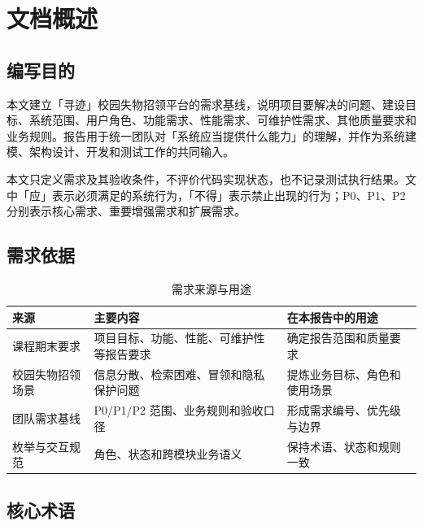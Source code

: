 \section{文档概述}

\subsection{编写目的}

本文建立「寻迹」校园失物招领平台的需求基线，说明项目要解决的问题、建设目标、系统范围、用户角色、功能需求、性能需求、可维护性需求、其他质量要求和业务规则。报告用于统一团队对「系统应当提供什么能力」的理解，并作为系统建模、架构设计、开发和测试工作的共同输入。

本文只定义需求及其验收条件，不评价代码实现状态，也不记录测试执行结果。文中「应」表示必须满足的系统行为，「不得」表示禁止出现的行为；P0、P1、P2 分别表示核心需求、重要增强需求和扩展需求。

\subsection{需求依据}

\begin{table}[H]
  \centering
  \caption{需求来源与用途}
  \begin{tabularx}{\textwidth}{L{3.0cm} Y Y}
    \toprule
    来源 & 主要内容 & 在本报告中的用途 \\
    \midrule
    课程期末要求 & 项目目标、功能、性能、可维护性等报告要求 & 确定报告范围和质量要求 \\
    校园失物招领场景 & 信息分散、检索困难、冒领和隐私保护问题 & 提炼业务目标、角色和使用场景 \\
    团队需求基线 & P0/P1/P2 范围、业务规则和验收口径 & 形成需求编号、优先级与边界 \\
    枚举与交互规范 & 角色、状态和跨模块业务语义 & 保持术语、状态和规则一致 \\
    \bottomrule
  \end{tabularx}
\end{table}

\subsection{核心术语}

